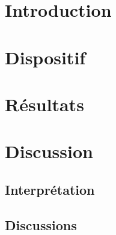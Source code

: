 \documentclass[a4paper,12pt,oneside]{article}
\begin{document}
\title{}
\author{Laurent Rohrbasser \& Tim Tuuva}

\maketitle
\tableofcontents
\baselineskip=16pt
\parindent=15pt
\parskip=5pt

\begin{abstract}
\end{abstract}

\section{Introduction}

\section{Dispositif}


\section{Résultats}

\begin{figure}[h!]
  \begin{center}
  \caption{} \label{fig:}
  \end{center}
\end{figure}

\section{Discussion}%

\subsection{Interprétation}

\subsection{Discussions}
\end{document}
